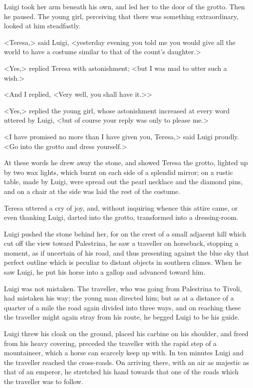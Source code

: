 {Luigi took her arm beneath his own, and led her to the door of the grotto. Then he paused. The young girl, perceiving that there was something extraordinary, looked at him steadfastly. 

<Teresa,> said Luigi, <yesterday evening you told me you would give all the world to have a costume similar to that of the count's daughter.> 

<Yes,> replied Teresa with astonishment; <but I was mad to utter such a wish.> 

<And I replied, <Very well, you shall have it.>>

<Yes,> replied the young girl, whose astonishment increased at every word uttered by Luigi, <but of course your reply was only to please me.> 

<I have promised no more than I have given you, Teresa,> said Luigi proudly. <Go into the grotto and dress yourself.> 

At these words he drew away the stone, and showed Teresa the grotto, lighted up by two wax lights, which burnt on each side of a splendid mirror; on a rustic table, made by Luigi, were spread out the pearl necklace and the diamond pins, and on a chair at the side was laid the rest of the costume. 

Teresa uttered a cry of joy, and, without inquiring whence this attire came, or even thanking Luigi, darted into the grotto, transformed into a dressing-room. 

Luigi pushed the stone behind her, for on the crest of a small adjacent hill which cut off the view toward Palestrina, he saw a traveller on horseback, stopping a moment, as if uncertain of his road, and thus presenting against the blue sky that perfect outline which is peculiar to distant objects in southern climes. When he saw Luigi, he put his horse into a gallop and advanced toward him. 

Luigi was not mistaken. The traveller, who was going from Palestrina to Tivoli, had mistaken his way; the young man directed him; but as at a distance of a quarter of a mile the road again divided into three ways, and on reaching these the traveller might again stray from his route, he begged Luigi to be his guide. 

Luigi threw his cloak on the ground, placed his carbine on his shoulder, and freed from his heavy covering, preceded the traveller with the rapid step of a mountaineer, which a horse can scarcely keep up with. In ten minutes Luigi and the traveller reached the cross-roads. On arriving there, with an air as majestic as that of an emperor, he stretched his hand towards that one of the roads which the traveller was to follow. 

}
